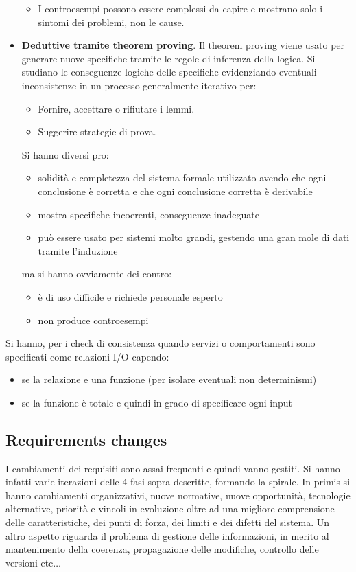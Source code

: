 \begin{itemize}
\begin{itemize}
        \item I controesempi possono essere complessi da capire e mostrano solo i sintomi dei problemi, non le cause.
    \end{itemize}
    \item \textbf{Deduttive tramite theorem proving}. Il theorem proving viene usato per generare nuove specifiche tramite le regole di inferenza della logica. Si studiano le conseguenze logiche delle specifiche evidenziando eventuali inconsistenze in un processo generalmente iterativo per:
    \begin{itemize}
        \item Fornire, accettare o rifiutare i lemmi.
        \item Suggerire strategie di prova.
    \end{itemize}
    Si hanno diversi pro:
    \begin{itemize}
        \item solidità e completezza del sistema formale utilizzato avendo che ogni conclusione è corretta e che ogni conclusione corretta è derivabile
        \item mostra specifiche incoerenti, conseguenze inadeguate
        \item può essere usato per sistemi molto grandi, gestendo una gran mole di dati tramite l'induzione
    \end{itemize}
    ma si hanno ovviamente dei contro:
    \begin{itemize}
        \item è di uso difficile e richiede personale esperto
        \item non produce controesempi
    \end{itemize}
\end{itemize}
Si hanno, per i check di consistenza quando servizi o comportamenti sono specificati come relazioni I/O capendo:
\begin{itemize}
    \item se la relazione e una funzione (per isolare eventuali non determinismi)
    \item se la funzione è totale e quindi in grado di specificare ogni input
\end{itemize}
\subsection{Requirements changes}
I cambiamenti dei requisiti sono assai frequenti e quindi vanno gestiti. Si hanno infatti varie iterazioni delle 4 fasi sopra descritte, formando la spirale. In primis si hanno cambiamenti organizzativi, nuove normative, nuove opportunità, tecnologie alternative, priorità e vincoli in evoluzione oltre ad una migliore comprensione delle caratteristiche, dei punti di forza, dei limiti e dei difetti del sistema. Un altro aspetto riguarda il problema di gestione delle informazioni, in merito al mantenimento della coerenza, propagazione delle modifiche, controllo delle versioni etc$\dots$

